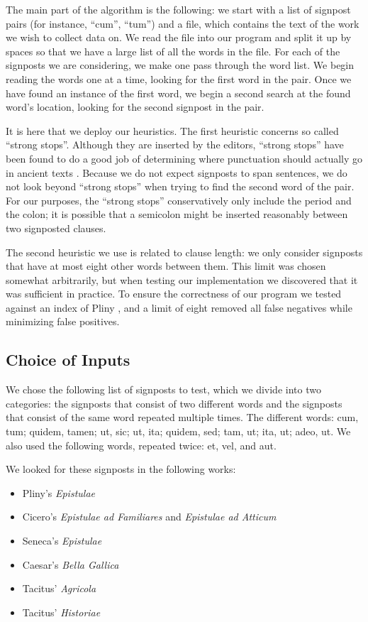 The main part of the algorithm is the following: we start with a list of signpost pairs (for instance, ``cum'', ``tum'') and a file, which contains the text of the work we wish to collect data on. We read the file into our program and split it up by spaces so that we have a large list of all the words in the file. For each of the signposts we are considering, we make one pass through the word list. We begin reading the words one at a time, looking for the first word in the pair. Once we have found an instance of the first word, we begin a second search at the found word's location, looking for the second signpost in the pair.

It is here that we deploy our heuristics. The first heuristic concerns so called ``strong stops''. Although they are inserted by the editors, ``strong stops'' have been found to do a good job of determining where punctuation should actually go in ancient texts \cite{strongstop}. Because we do not expect signposts to span sentences, we do not look beyond ``strong stops'' when trying to find the second word of the pair. For our purposes, the ``strong stops'' conservatively only include the period and the colon; it is possible that a semicolon might be inserted reasonably between two signposted clauses.

The second heuristic we use is related to clause length: we only consider signposts that have at most eight other words between them. This limit was chosen somewhat arbitrarily, but when testing our implementation we discovered that it was sufficient in practice. To ensure the correctness of our program we tested against an index of Pliny \cite{index}, and a limit of eight removed all false negatives while minimizing false positives.

\subsection{Choice of Inputs}

We chose the following list of signposts to test, which we divide into two categories: the signposts that consist of two different words and the signposts that consist of the same word repeated multiple times. The different words: cum, tum; quidem, tamen; ut, sic; ut, ita; quidem, sed; tam, ut; ita, ut; adeo, ut. We also used the following words, repeated twice: et, vel, and aut.

We looked for these signposts in the following works:
\begin{itemize}
  \item Pliny's \textit{Epistulae}
  \item Cicero's \textit{Epistulae ad Familiares} and \textit{Epistulae ad Atticum}
  \item Seneca's \textit{Epistulae}
  \item Caesar's \textit{Bella Gallica}
  \item Tacitus' \textit{Agricola}
  \item Tacitus' \textit{Historiae}
\end{itemize}

